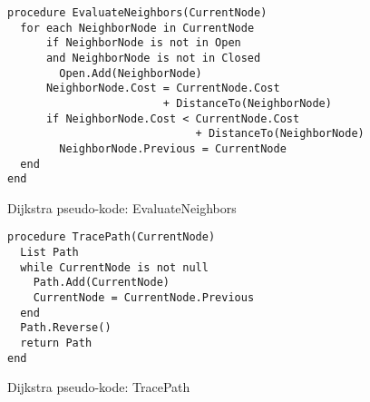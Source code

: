 \begin{figure}[H]
\begin{lstlisting}
procedure EvaluateNeighbors(CurrentNode)
  for each NeighborNode in CurrentNode
      if NeighborNode is not in Open
      and NeighborNode is not in Closed
        Open.Add(NeighborNode)
      NeighborNode.Cost = CurrentNode.Cost 
                        + DistanceTo(NeighborNode)
      if NeighborNode.Cost < CurrentNode.Cost
                             + DistanceTo(NeighborNode)
        NeighborNode.Previous = CurrentNode
  end
end
\end{lstlisting}
\caption{Dijkstra pseudo-kode: EvaluateNeighbors}\label{DijkstraCodeEvaluateNeighbors}
\end{figure}

\begin{figure}[H]
\begin{lstlisting}
procedure TracePath(CurrentNode)
  List Path
  while CurrentNode is not null
    Path.Add(CurrentNode)
    CurrentNode = CurrentNode.Previous
  end
  Path.Reverse()
  return Path
end
\end{lstlisting}
\caption{Dijkstra pseudo-kode: TracePath}\label{DijkstraCodeTracePath}
\end{figure}